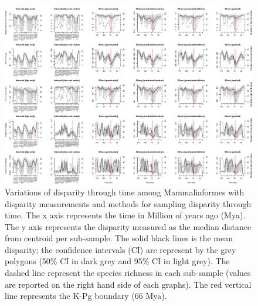 \documentclass[12pt,letterpaper]{article}
\begin{document}
\begin{landscape}
\begin{figure}[!htbp]
\centering
    \includegraphics[width=\textwidth,height=\textheight,keepaspectratio]{Figures/Figure_S6.pdf}
\caption{\scriptsize{Variations of disparity through time among Mammaliaformes with disparity measurements and methods for sampling disparity through time. The x axis represents the time in Million of years ago (Mya). The y axis represents the disparity measured as the median distance from centroid per sub-sample. The solid black lines is the mean disparity; the confidence intervals (CI) are represent by the grey polygons (50\% CI in dark grey and 95\% CI in light grey). The dashed line represent the species richness in each sub-sample (values are reported on the right hand side of each graphs). The red vertical line represents the K-Pg boundary (66 Mya).}}
\end{figure}
\end{landscape}
\end{document}

